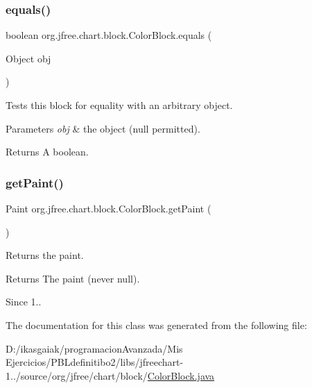 \subsubsection{\texorpdfstring{equals()}{equals()}}
{\footnotesize\ttfamily boolean org.\+jfree.\+chart.\+block.\+Color\+Block.\+equals (\begin{DoxyParamCaption}\item[{Object}]{obj }\end{DoxyParamCaption})}

Tests this block for equality with an arbitrary object.


\begin{DoxyParams}{Parameters}
{\em obj} & the object ({\ttfamily null} permitted).\\
\hline
\end{DoxyParams}
\begin{DoxyReturn}{Returns}
A boolean. 
\end{DoxyReturn}
\mbox{\label{classorg_1_1jfree_1_1chart_1_1block_1_1_color_block_a2c63daa0556f70bbbeaf9d6de274257b}} 
\subsubsection{\texorpdfstring{get\+Paint()}{getPaint()}}
{\footnotesize\ttfamily Paint org.\+jfree.\+chart.\+block.\+Color\+Block.\+get\+Paint (\begin{DoxyParamCaption}{ }\end{DoxyParamCaption})}

Returns the paint.

\begin{DoxyReturn}{Returns}
The paint (never {\ttfamily null}).
\end{DoxyReturn}
\begin{DoxySince}{Since}
1.. 
\end{DoxySince}


The documentation for this class was generated from the following file\+:\begin{DoxyCompactItemize}
\item 
D\+:/ikasgaiak/programacion\+Avanzada/\+Mis Ejercicios/\+P\+B\+Ldefinitibo2/libs/jfreechart-\/1../source/org/jfree/chart/block/\mbox{\hyperlink{_color_block_8java}{Color\+Block.\+java}}\end{DoxyCompactItemize}
